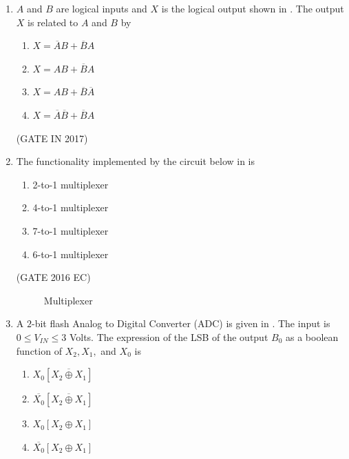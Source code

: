 \begin{enumerate}[label=\arabic*.,ref=\theenumi]
\begin{enumerate}
    \item {}
\end{enumerate}
%
\item $A$ and $B$ are logical inputs and $X$ is the logical output shown in 
.
	The output $X$ is related to $A$ and $B$ by 
\begin{enumerate}
\item $X = \overline{A}B + \overline{B}A$
\item $X = AB + \overline{B}A$
\item $X = AB + \overline{B}\overline{A}$
\item $X = \overline{A}\overline{B} + \overline{B}A$
\end{enumerate}
\hfill (GATE IN 2017)
\begin{figure}[H]
\centering
\resizebox{0.75\columnwidth}{!}{%

	}
\caption{}
\label{fig:gate_in_2017_30}
\end{figure}
\item The functionality implemented by the circuit below 
in
	is 
\begin{enumerate}
\item 2-to-1 multiplexer
\item 4-to-1 multiplexer
\item 7-to-1 multiplexer
\item 6-to-1 multiplexer
\end{enumerate}
\hfill (GATE 2016 EC)
%
\begin{figure}[H]
\centering
\resizebox{0.5\columnwidth}{!}{%

	}
\caption{Multiplexer}
\label{fig:gate_ec_2016_43}
\end{figure}
%
\item A $2$-bit flash Analog to Digital Converter (ADC) is given in . The input is $0 \leq V_{IN} \leq 3$ Volts. The expression of the LSB of the output $B_0$ as a boolean function of $X_2,X_1,$ and $X_0$ is 
\begin{enumerate}
\item $X_0 \left[ \overline {X_2 \oplus X_1} \right]$
\item $\overline {X_0} \left[ \overline {X_2 \oplus X_1} \right]$
\item $X_0 \left[ X_2 \oplus X_1 \right]$
\item $\overline{X_0} \left[ X_2 \oplus X_1 \right]$
\end{enumerate}

\end{enumerate}
